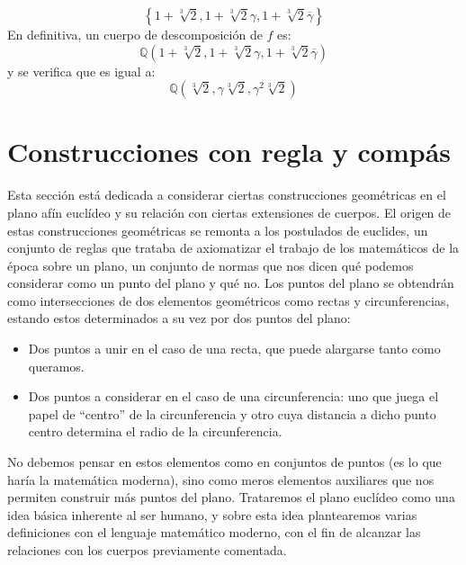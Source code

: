 \begin{ejercicio}
    \begin{equation*}
        \left\{1+\sqrt[3]{2}, 1+\sqrt[3]{2}\gamma, 1+\sqrt[3]{2}\overline{\gamma} \right\}
    \end{equation*}
    En definitiva, un cuerpo de descomposición de $f$ es:
    \begin{equation*}
        \mathbb{Q}\left(1+\sqrt[3]{2}, 1+\sqrt[3]{2}\gamma, 1+\sqrt[3]{2}\overline{\gamma}\right)
    \end{equation*}
    y se verifica que es igual a:
    \begin{equation*}
        \mathbb{Q}\left(\sqrt[3]{2}, \gamma\sqrt[3]{2}, \gamma^2\sqrt[3]{2}\right)
    \end{equation*}
\end{ejercicio}

\section{Construcciones con regla y compás}
Esta sección está dedicada a considerar ciertas construcciones geométricas en el plano afín euclídeo y su relación con ciertas extensiones de cuerpos. El origen de estas construcciones geométricas se remonta a los postulados de euclides, un conjunto de reglas que trataba de axiomatizar el trabajo de los matemáticos de la época sobre un plano, un conjunto de normas que nos dicen qué podemos considerar como un punto del plano y qué no. Los puntos del plano se obtendrán como intersecciones de dos elementos geométricos como rectas y circunferencias, estando estos determinados a su vez por dos puntos del plano:
\begin{itemize}
    \item Dos puntos a unir en el caso de una recta, que puede alargarse tanto como queramos.
    \item Dos puntos a considerar en el caso de una circunferencia: uno que juega el papel de ``centro'' de la circunferencia y otro cuya distancia a dicho punto centro determina el radio de la circunferencia.
\end{itemize}
No debemos pensar en estos elementos como en conjuntos de puntos (es lo que haría la matemática moderna), sino como meros elementos auxiliares que nos permiten construir más puntos del plano. Trataremos el plano euclídeo como una idea básica inherente al ser humano, y sobre esta idea plantearemos varias definiciones con el lenguaje matemático moderno, con el fin de alcanzar las relaciones con los cuerpos previamente comentada.\\


